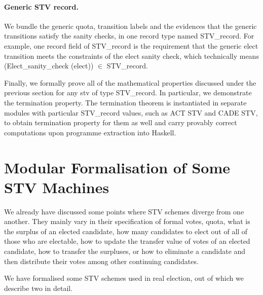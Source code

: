 \documentclass{llncs}
\begin{document}
\paragraph{Generic STV record.} We bundle the generic quota,  transition labels and the evidences that the generic transitions satisfy the sanity checks, in one record type named {\selectfont STV\_record}. For example, one record field of {\selectfont STV\_record} is the requirement that the generic elect transition meets the constraints of the elect sanity check, which technically means ({\selectfont Elect\_sanity\_check (elect)}) $\in$ {\selectfont STV\_record}. 


Finally, we formally prove all of the mathematical properties discussed under the previous section for any {\selectfont stv} of type {\selectfont STV\_record}. In particular, we demonstrate the termination property. The termination theorem is instantiated in separate modules with particular {\selectfont STV\_record} values, such as ACT STV and CADE STV, to obtain termination property for them as well and carry provably correct computations upon programme extraction into Haskell.
\section{Modular Formalisation of Some STV Machines}
We already have discussed some points where STV schemes diverge from one another. They mainly vary in their specification of formal votes, quota, what is the surplus of an elected candidate, how many candidates to elect out of all of those who are electable, how to update the transfer value of votes of an elected candidate, how to transfer the surpluses, or how to eliminate a candidate and then distribute their votes among other continuing candidates.


We have formalised some STV schemes used in real election, out of
which we describe two in detail. 
  
\end{document}
